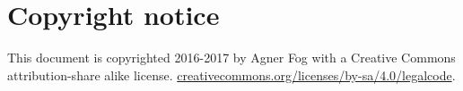 \documentclass[forwardcom.tex]{subfiles}
\begin{document}
\RaggedRight

\chapter{Copyright notice}
This document is copyrighted 2016-2017 by Agner Fog with a Creative Commons attribution-share alike license.
\href{http://creativecommons.org/licenses/by-sa/4.0/legalcode}{creativecommons.org/licenses/by-sa/4.0/legalcode}.
\end{document}
